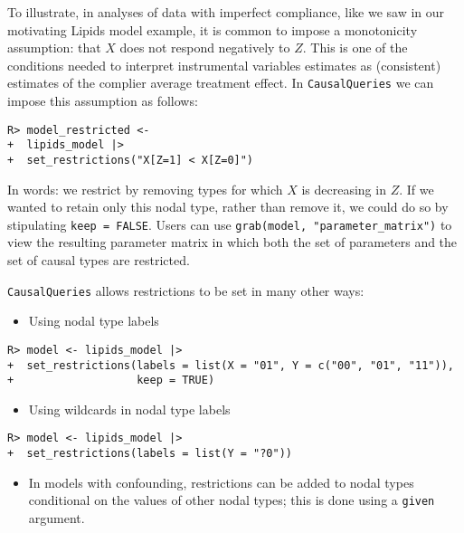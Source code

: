 \documentclass[
  11pt,
  article]{jss}
\providecommand{\tightlist}{%
  \setlength{\itemsep}{0pt}\setlength{\parskip}{0pt}}\usepackage{longtable,booktabs,array}
\begin{document}
To illustrate, in analyses of data with imperfect compliance, like we
saw in our motivating Lipids model example, it is common to impose a
monotonicity assumption: that \(X\) does not respond negatively to
\(Z\). This is one of the conditions needed to interpret instrumental
variables estimates as (consistent) estimates of the complier average
treatment effect. In \texttt{CausalQueries} we can impose this
assumption as follows:

\begin{verbatim}
R> model_restricted <- 
+  lipids_model |> 
+  set_restrictions("X[Z=1] < X[Z=0]")
\end{verbatim}

In words: we restrict by removing types for which \(X\) is decreasing in
\(Z\). If we wanted to retain only this nodal type, rather than remove
it, we could do so by stipulating \texttt{keep\ =\ FALSE}. Users can use
\texttt{grab(model,\ "parameter\_matrix")} to view the resulting
parameter matrix in which both the set of parameters and the set of
causal types are restricted.

\texttt{CausalQueries} allows restrictions to be set in many other ways:

\begin{itemize}
\tightlist
\item
  Using nodal type labels
\end{itemize}

\begin{verbatim}
R> model <- lipids_model |>
+  set_restrictions(labels = list(X = "01", Y = c("00", "01", "11")), 
+                   keep = TRUE)
\end{verbatim}

\begin{itemize}
\tightlist
\item
  Using wildcards in nodal type labels
\end{itemize}

\begin{verbatim}
R> model <- lipids_model |>
+  set_restrictions(labels = list(Y = "?0"))
\end{verbatim}

\begin{itemize}
\tightlist
\item
  In models with confounding, restrictions can be added to nodal types
  conditional on the values of other nodal types; this is done using a
  \texttt{given} argument.
\end{itemize}
\end{document}
